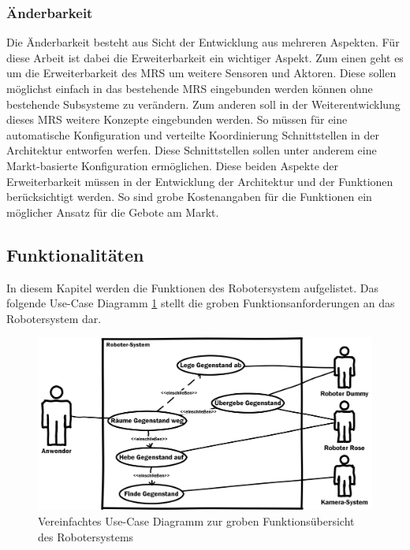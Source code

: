 \subsubsection{Änderbarkeit}
Die Änderbarkeit besteht aus Sicht der Entwicklung aus mehreren Aspekten. Für diese Arbeit ist dabei die Erweiterbarkeit ein wichtiger Aspekt. Zum einen geht es um die Erweiterbarkeit des MRS um weitere Sensoren und Aktoren. Diese sollen möglichst einfach in das bestehende MRS eingebunden werden können ohne bestehende Subsysteme zu verändern. Zum anderen soll in der Weiterentwicklung dieses MRS weitere Konzepte eingebunden werden. So müssen für eine automatische Konfiguration und verteilte Koordinierung Schnittstellen in der Architektur entworfen werfen. Diese Schnittstellen sollen unter anderem eine Markt-basierte Konfiguration ermöglichen. Diese beiden Aspekte der Erweiterbarkeit müssen in der Entwicklung der Architektur und der Funktionen berücksichtigt werden. So sind grobe Kostenangaben für die Funktionen ein möglicher Ansatz für die Gebote am Markt.

\subsection{Funktionalitäten}
\label{sec:dev-funk}

In diesem Kapitel werden die Funktionen des Robotersystem aufgelistet. Das folgende Use-Case Diagramm \ref{fig:dev-usecase} stellt die groben Funktionsanforderungen an das Robotersystem dar.

\begin{figure}[H]
	\centering
	\includegraphics[scale=0.8]{fig/UseCase}   
	\caption[Use-Case Robotersystem]{Vereinfachtes Use-Case Diagramm zur groben Funktionsübersicht des Robotersystems}
	\label{fig:dev-usecase}
\end{figure}

